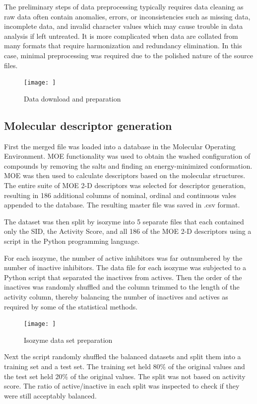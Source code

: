 The preliminary steps of data preprocessing typically requires data cleaning as raw data often contain anomalies, errors, or inconsistencies such as missing data, incomplete data, and invalid character values which may cause trouble in data analysis if left untreated. It is more complicated when data are collated from many formats that require harmonization and redundancy elimination. \cite{Nantasenamat2009} In this case, minimal preprocessing was required due to the polished nature of the source files.


\begin{figure}[h,t]
  \caption{Data download and preparation}
  \centering
   \texttt{[image: ]}
\end{figure}


\subsection{Molecular descriptor generation}
First the merged file was loaded into a database in the Molecular Operating Environment. MOE functionality was used to obtain the washed configuration of compounds by removing the salts and finding an energy-minimized conformation. MOE was then used to calculate descriptors based on the molecular structures. The entire suite of MOE 2-D descriptors was selected for descriptor generation, resulting in 186 additional columns of nominal, ordinal and continuous vales appended to the database. The resulting master file was saved in .csv format.

The dataset was then split by isozyme into 5 separate files that each contained only the SID, the Activity Score, and all 186 of the MOE 2-D descriptors using a script in the Python programming language.

For each isozyme, the number of active inhibitors was far outnumbered by the number of inactive inhibitors. The data file for each isozyme was subjected to a Python script that separated the inactives from actives. Then the order of the inactives was randomly shuffled and the column trimmed to the length of the activity column, thereby balancing the number of inactives and actives as required by some of the statistical methods. 

\begin{figure}[h,t]
  \caption{Isozyme data set preparation}
  \centering
   \texttt{[image: ]}
\end{figure}

Next the script randomly shuffled the balanced datasets and split them into a training set and a test set. The training set held 80\% of the original values and the test set held 20\% of the original values. The split was not based on activity score. The ratio of active/inactive in each split was inspected to check if they were still acceptably balanced.

